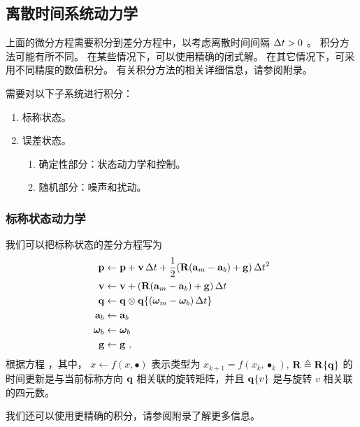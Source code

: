 \subsection{离散时间系统动力学}

上面的微分方程需要积分到差分方程中，以考虑离散时间间隔 $\Delta t>0$ 。
积分方法可能有所不同。 
在某些情况下，可以使用精确的闭式解。 
在其它情况下，可采用不同精度的数值积分。 
有关积分方法的相关详细信息，请参阅附录。

需要对以下子系统进行积分：
%
\begin{enumerate}
\item 标称状态。
\item 误差状态。
\begin{enumerate}
\item 确定性部分：状态动力学和控制。
\item 随机部分：噪声和扰动。
\end{enumerate}
\end{enumerate}

\subsubsection{标称状态动力学}

我们可以把标称状态的差分方程写为
%
\begin{subequations}
%
\begin{align}
{\bf p} &\gets {\bf p} + {\bf v}\, \Delta t + \frac{1}{2}({\bf R}({\bf a}_{m}-{\bf a}_{b})+{\bf g})\, \Delta t ^2\\
{\bf v} &\gets {\bf v} + ({\bf R}({\bf a}_{m}-{\bf a}_{b})+{\bf g})\, \Delta t \\
{\bf q} &\gets {\bf q}\otimes {\bf q}\{({\bm \omega}_{m} - {\bm \omega}_{b})\, \Delta t\} \\
{\bf a}_{b} &\gets {\bf a}_{b} \\
{\bm \omega}_{b} &\gets {\bm \omega}_{b} \\
{\bf g} &\gets {\bf g}~,
\end{align}%
\end{subequations}%
%
根据方程  ，其中， $x\gets f(x,\bullet)$ 表示类型为 $x_{k+1} = f(x_k,\bullet_k)$, ${\bf R}\triangleq{\bf R}\{{\bf q}\}$ 的时间更新是与当前标称方向 ${\bf q}$ 相关联的旋转矩阵，并且 ${\bf q}\{v\}$ 是与旋转 $v$ 相关联的四元数。

我们还可以使用更精确的积分，请参阅附录了解更多信息。



